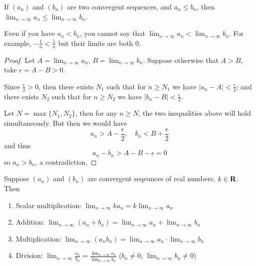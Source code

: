 \begin{lemma}
If $(a_n)$ and $(b_n)$ are two convergent sequences, and $a_n \le b_n$, then $\displaystyle\lim_{n\to\infty}a_n\le\lim_{n\to\infty}b_n$.
\end{lemma}

\begin{remark}
Even if you have $a_n<b_n$, you cannot say that $\displaystyle\lim_{n\to\infty}a_n<\lim_{n\to\infty}b_n$. For example, $-\frac{1}{n}<\frac{1}{n}$ but their limits are both $0$.
\end{remark}

\begin{proof}
Let $\displaystyle A=\lim_{n\to\infty}a_n$, $\displaystyle B=\lim_{n\to\infty}b_n$. Suppose otherwise that $A>B$, take $\epsilon=A-B>0$.

Since $\frac{\epsilon}{2}>0$, then there exists $N_1$ such that for $n\ge N_1$ we have $|a_n-A|<\frac{\epsilon}{2}$; and there exists $N_2$ such that for $n\ge N_2$ we have $|b_n-B|<\frac{\epsilon}{2}$.

Let $N=\max\{N_1,N_2\}$, then for any $n\ge N$, the two inequalities above will hold simultaneously. But then we would have
\[a_n>A-\frac{\epsilon}{2},\quad b_n<B+\frac{\epsilon}{2}\]
and thus
\[a_n-b_n>A-B-\epsilon=0\]
so $a_n>b_n$, a contradiction.
\end{proof}

\begin{proposition}
Suppose $(a_n)$ and $(b_n)$ are convergent seqeunces of real numbers, $k\in\mathbf R$. Then
\begin{enumerate}[label=(\roman*)]
\item Scalar multiplication: $\displaystyle\lim_{n\to\infty} ka_n=k\lim_{n\to\infty}a_n$
\item Addition: $\displaystyle\lim_{n\to\infty}(a_n+b_n)=\lim_{n\to\infty}a_n+\lim_{n\to\infty}b_n$
\item Multiplication: $\displaystyle\lim_{n\to\infty}(a_n b_n)=\lim_{n\to\infty}a_n\cdot\lim_{n\to\infty}b_n$
\item Division: $\displaystyle\lim_{n\to\infty}\frac{a_n}{b_n}=\frac{\lim_{n\to\infty} a_n}{\lim_{n\to\infty} b_n}$ ($b_n\neq0$, $\displaystyle\lim_{n\to\infty}b_n\neq0$)
\end{enumerate}
\end{proposition}

